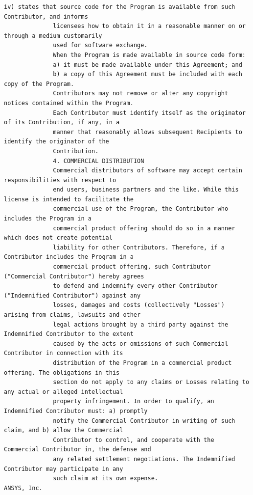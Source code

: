 \begin{lstlisting}[basicstyle=\ttfamily\scriptsize,breaklines=true]
              iv) states that source code for the Program is available from such Contributor, and informs
              licensees how to obtain it in a reasonable manner on or through a medium customarily
              used for software exchange.
              When the Program is made available in source code form:
              a) it must be made available under this Agreement; and
              b) a copy of this Agreement must be included with each copy of the Program.
              Contributors may not remove or alter any copyright notices contained within the Program.
              Each Contributor must identify itself as the originator of its Contribution, if any, in a
              manner that reasonably allows subsequent Recipients to identify the originator of the
              Contribution.
              4. COMMERCIAL DISTRIBUTION
              Commercial distributors of software may accept certain responsibilities with respect to
              end users, business partners and the like. While this license is intended to facilitate the
              commercial use of the Program, the Contributor who includes the Program in a
              commercial product offering should do so in a manner which does not create potential
              liability for other Contributors. Therefore, if a Contributor includes the Program in a
              commercial product offering, such Contributor ("Commercial Contributor") hereby agrees
              to defend and indemnify every other Contributor ("Indemnified Contributor") against any
              losses, damages and costs (collectively "Losses") arising from claims, lawsuits and other
              legal actions brought by a third party against the Indemnified Contributor to the extent
              caused by the acts or omissions of such Commercial Contributor in connection with its
              distribution of the Program in a commercial product offering. The obligations in this
              section do not apply to any claims or Losses relating to any actual or alleged intellectual
              property infringement. In order to qualify, an Indemnified Contributor must: a) promptly
              notify the Commercial Contributor in writing of such claim, and b) allow the Commercial
              Contributor to control, and cooperate with the Commercial Contributor in, the defense and
              any related settlement negotiations. The Indemnified Contributor may participate in any
              such claim at its own expense.
ANSYS, Inc.


\end{lstlisting}
